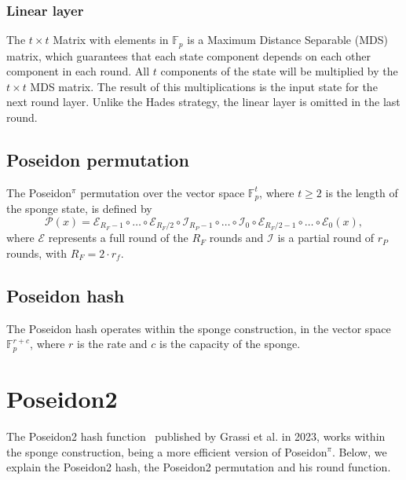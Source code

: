\subsubsection*{Linear layer}
The $t\times t$ Matrix with elements in $\mathbb{F}_{p}$ is a Maximum Distance Separable (MDS) matrix, which guarantees that each state component depends on each other component in each round. All $t$ components of the state will be multiplied by the $t \times t$ MDS matrix. The result of this multiplications is the input state for the next round layer. Unlike the Hades strategy, the linear layer is omitted in the last round.

\subsection*{Poseidon permutation}
The Poseidon$^\pi$ permutation over the vector space $\mathbb{F}_p^t$, where $t \geq 2$ is the length of the sponge state, is defined by
\begin{equation}
    \mathcal{P}(x) = \mathcal{E}_{R_F-1} \circ \dots \circ \mathcal{E}_{R_F/2} \circ \mathcal{I}_{R_P-1} \circ \dots \circ \mathcal{I}_0 \circ \mathcal{E}_{R_F/{2-1}} \circ \dots \circ \mathcal{E}_0(x),
\end{equation}
\label{eq:poseidon-perm}
where $\mathcal{E}$ represents a full round of the $R_F$ rounds and $\mathcal{I}$ is a partial round of $r_P$ rounds, with $R_F = 2\cdot r_f$.

\subsection*{Poseidon hash}
The Poseidon hash operates within the sponge construction, in the vector space $\mathbb{F}_p^{r+c}$, where $r$ is the rate and $c$ is the capacity of the sponge.

\section{Poseidon2}
The Poseidon2 hash function~\cite{grassi2023poseidon2} published by Grassi et al. in 2023, works within the sponge construction, being a more efficient version of Poseidon$^\pi$. Below, we explain the Poseidon2 hash, the Poseidon2 permutation and his round function.

